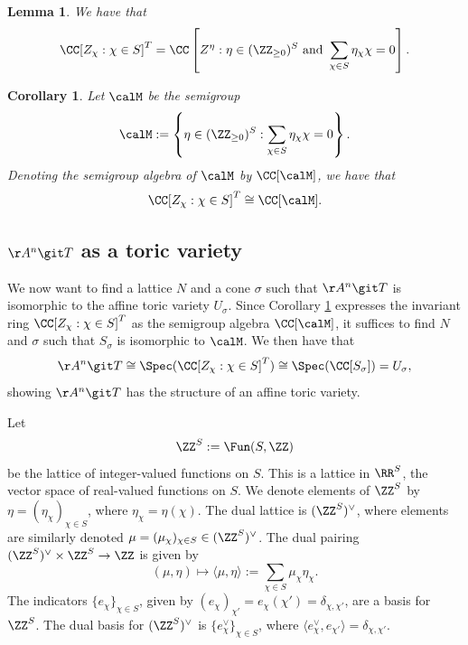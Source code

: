 \documentclass[12pt]{amsart}
\theoremstyle{plain}
\newtheorem{corollary}[theorem]{Corollary}
\newtheorem{lemma}[theorem]{Lemma}
\begin{document}
\begin{lemma}
We have that 
$$\CC[Z_\chi : \chi \in S]^T = \CC\left[Z^\eta : \eta \in (\ZZ_{\ge 0})^S \text{ and }\sum_{\chi \in S} \eta_\chi \chi = 0\right].$$
\end{lemma}
\begin{corollary}\label{invariantringsemigroupalgebra}
Let $\calM$ be the semigroup 
$$\calM := \left\{ \eta \in (\ZZ_{\ge 0})^S : \sum_{\chi \in S} \eta_\chi \chi = 0\right\}.$$
Denoting the semigroup algebra of $\calM$ by $\CC[\calM]$, we have that
$$\CC[Z_\chi : \chi \in S]^T \cong \CC[\calM].$$
\end{corollary}





\subsection{$\AA^n \git T$ as a toric variety}
We now want to find a lattice $N$ and a cone $\sigma$ such that $\AA^n \git T$ is isomorphic to the affine toric variety $U_\sigma$.
Since Corollary \ref{invariantringsemigroupalgebra} expresses the invariant ring $\CC[Z_\chi : \chi \in S]^T$ as the semigroup algebra $\CC[\calM]$, it suffices to find $N$ and $\sigma$ such that $S_\sigma$ is isomorphic to $\calM$.
We then have that
$$\AA^n \git T \cong \Spec(\CC[Z_\chi : \chi \in S]^T) \cong \Spec(\CC[S_\sigma]) = U_\sigma,$$
showing $\AA^n \git T$ has the structure of an affine toric variety.

Let 
$$\ZZ^S := \Fun(S, \ZZ)$$
be the lattice of integer-valued functions on $S$.
This is a lattice in $\RR^S$, the vector space of real-valued functions on $S$.
We denote elements of $\ZZ^S$ by $\eta = (\eta_\chi)_{\chi \in S}$, where $\eta_\chi = \eta(\chi)$.
The dual lattice is $(\ZZ^S)^\vee$, where elements are similarly denoted $\mu = (\mu_\chi)_{\chi \in S} \in (\ZZ^S)^\vee$.
The dual pairing $(\ZZ^S)^\vee \times \ZZ^S \to \ZZ$ is given by
$$(\mu, \eta) \mapsto \langle \mu, \eta \rangle := \sum_{\chi \in S} \mu_\chi \eta_\chi.$$
The indicators $\{e_\chi\}_{\chi\in S}$, given by $(e_\chi)_{\chi'} = e_\chi(\chi') = \delta_{\chi, \chi'}$, are a basis for $\ZZ^S$.
The dual basis for $(\ZZ^S)^\vee$ is $\{e_\chi^\vee\}_{\chi\in S}$, where $\langle e_\chi^\vee, e_{\chi'} \rangle = \delta_{\chi, \chi'}$.
\end{document}
